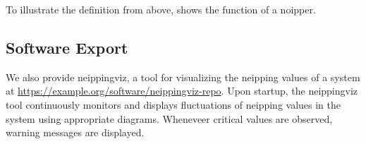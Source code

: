 To illustrate the definition from above,  shows the function of a noipper.

\subsection{Software Export}

We also provide neippingviz, a tool for visualizing the neipping values of a system at \url{https://example.org/software/neippingviz-repo}. Upon startup, the neippingviz tool continuously monitors and displays fluctuations of neipping values in the system using appropriate diagrams. Wheneveer critical values are observed, warning messages are displayed. 

